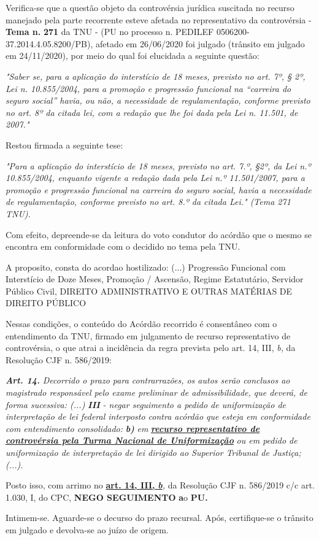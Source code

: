 \documentclass[12pt]{article}
\begin{document}
\justifying
\noindent Verifica-se que a questão objeto da controvérsia jurídica suscitada no recurso manejado pela parte recorrente esteve afetada no representativo da controvérsia - \textbf{Tema n. }\textbf{271} da TNU - (PU no processo n. PEDILEF 0506200-37.2014.4.05.8200/PB),  afetado em 26/06/2020 foi julgado (trânsito em julgado em 24/11/2020), por meio do qual foi elucidada a seguinte questão:

\noindent \textit{"Saber se, para a aplicação do interstício de 18 meses, previsto no art. 7º, § 2º, Lei n. 10.855/2004, para a promoção e progressão funcional na “carreira do seguro social” havia, ou não, a necessidade de regulamentação, conforme previsto no art. 8º da citada lei, com a redação que lhe foi dada pela Lei n. 11.501, de 2007."}

\noindent Restou firmada a seguinte tese:

\noindent \textit{"Para a aplicação do interstício de 18 meses, previsto no art. 7.º, §2º, da Lei n.º 10.855/2004, enquanto vigente a redação dada pela Lei n.º 11.501/2007, para a promoção e progressão funcional na carreira do seguro social, havia a necessidade de regulamentação, conforme previsto no art. 8.º da citada Lei." (Tema 271 TNU).}

\noindent Com efeito, depreende-se da leitura do voto condutor do acórdão que o mesmo se encontra em conformidade com o decidido no  tema pela TNU.

\noindent A proposito, consta do acordao hostilizado: (...) Progressão Funcional com Interstício de Doze Meses, Promoção / Ascensão, Regime Estatutário, Servidor Público Civil, DIREITO ADMINISTRATIVO E OUTRAS MATÉRIAS DE DIREITO PÚBLICO

\noindent Nessas condições, o conteúdo do Acórdão recorrido é consentâneo com o entendimento da TNU, firmado em julgamento de recurso representativo de controvérsia, o que atrai a incidência da regra prevista pelo art. 14, III, \textit{b,} da Resolução CJF n. 586/2019:

\noindent \textit{\textbf{Art. 14.}}\textit{ Decorrido o prazo para contrarrazões, os autos serão conclusos ao magistrado responsável pelo exame preliminar de admissibilidade, que deverá, de forma sucessiva: (...) }\textit{\textbf{III }}\textit{- negar seguimento a pedido de uniformização de interpretação de lei federal interposto contra acórdão que esteja em conformidade com entendimento consolidado: }\textit{\textbf{b)}}\textit{ em }\uline{\textit{\textbf{recurso representativo de controvérsia pela Turma Nacional de Uniformização}}}\textit{ ou em pedido de uniformização de interpretação de lei dirigido ao Superior Tribunal de Justiça;(...).}

\noindent Posto isso, com arrimo no \uline{\textbf{art. 14, III, }}\uline{\textit{\textbf{b}}}\textit{,} da Resolução CJF n. 586/2019 c/c art. 1.030, I, do CPC, \textbf{NEGO SEGUIMENTO }\textbf{a}o\textbf{ PU}\textbf{.}

\noindent Intimem-se. Aguarde-se o decurso do prazo recursal. Após, certifique-se o trânsito em julgado e devolva-se ao juízo de origem.
\end{document}
